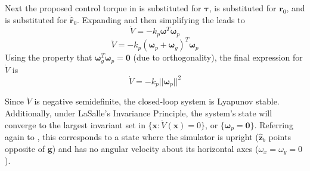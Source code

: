 Next the proposed control torque in  is substituted for $\bm{\tau}$,  is substituted for $\bm{r}_0$, and  is substituted for $\dot{\hat{\bm{r}}}_0$. Expanding and then simplifying the leads to
\begin{equation}
    \dot{V} = -k_p\bm{\omega}^T\bm{\omega}_p
\end{equation}
\begin{equation}
    \dot{V} = -k_p(\bm{\omega}_p+\bm{\omega}_g)^T\bm{\omega}_p
\end{equation}
Using the property that $\bm{\omega}_g^T\bm{\omega}_p=\bm{0}$ (due to orthogonality), the final expression for $\dot{V}$ is
\begin{equation}\label{equation:final_V_dot}
    \dot{V} = -k_p||\bm{\omega}_p||^2
\end{equation}

Since $\dot{V}$ is negative semidefinite, the closed-loop system is Lyapunov stable. Additionally, under LaSalle's Invariance Principle, the system's state will converge to the largest invariant set in $\{\bm{x}:\dot V(\bm{x})=0 \}$, or $\{\bm{\omega}_p=\bm{0}\}$. Referring again to , this corresponds to a state where the simulator is upright ($\hat{\bm{z}}_b$ points opposite of $\bm{g}$) and has no angular velocity about its horizontal axes ($\omega_x=\omega_y=0$). 

